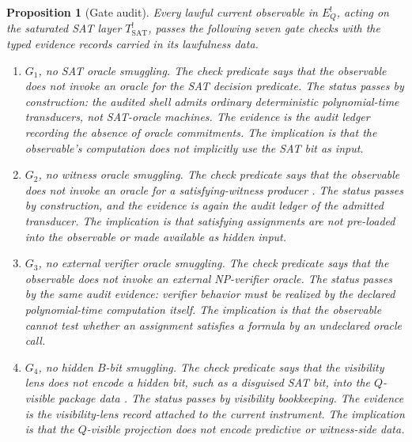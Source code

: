\documentclass[11pt]{article}
\newcommand{\Tsat}{T^{!}_{\mathrm{SAT}}}
\newcommand{\EQbang}{E^{!}_{Q}}
\newcommand{\GateOne}{G_{1}}                \newcommand{\GateTwo}{G_{2}}                \newcommand{\GateThree}{G_{3}}              \newcommand{\GateFour}{G_{4}}               \newcommand{\GateFive}{G_{5}}               \newcommand{\GateSix}{G_{6}}                \newcommand{\GateSeven}{G_{7}}
\newtheorem{proposition}[theorem]{Proposition}
\theoremstyle{definition}
\begin{document}
\begin{proposition}[Gate audit]
\label{prop:pvnp:gate-audit}
Every lawful current observable in \(\EQbang\), acting on the
saturated SAT layer \(\Tsat\), passes the following seven gate checks
with the typed evidence records carried in its lawfulness data.
\begin{enumerate}
  \item \(\GateOne\), \emph{no SAT oracle smuggling}.  The check
  predicate says that the observable does not invoke an oracle
  \citep{BakerGillSolovay1975Relativization} for the SAT decision
  predicate.  The status passes by construction: the audited shell
  admits ordinary deterministic polynomial-time transducers, not
  SAT-oracle machines.
  The evidence is the audit ledger recording the absence of oracle
  commitments.  The implication is that the observable's computation
  does not implicitly use the SAT bit as input.

  \item \(\GateTwo\), \emph{no witness oracle smuggling}.  The check
  predicate says that the observable does not invoke an oracle for a
  satisfying-witness producer \citep{FeigeShamir1990WitnessHiding,GoldwasserMicaliRackoff1989KnowledgeComplexity}.  The status passes by construction, and
  the evidence is again the audit ledger of the admitted transducer.
  The implication is that satisfying assignments are not pre-loaded
  into the observable or made available as hidden input.

  \item \(\GateThree\), \emph{no external verifier oracle smuggling}.
  The check predicate says that the observable does not invoke an
  external NP-verifier oracle.  The status passes by the same audit
  evidence: verifier behavior must be realized by the declared
  polynomial-time computation itself.  The implication is that the
  observable cannot test whether an assignment satisfies a formula by
  an undeclared oracle call.

  \item \(\GateFour\), \emph{no hidden \(B\)-bit smuggling}.  The
  check predicate says that the visibility lens does not encode a
  hidden bit, such as a disguised SAT bit, into the \(Q\)-visible
  package data
  \citep{GoguenMeseguer1982SecurityPolicies,SabelfeldMyers2003InformationFlow}.  The status passes by visibility bookkeeping.  The
  evidence is the visibility-lens record attached to the current
  instrument.  The implication is that the \(Q\)-visible projection
  does not encode predictive or witness-side data.


\end{enumerate}
\end{proposition}
\end{document}

